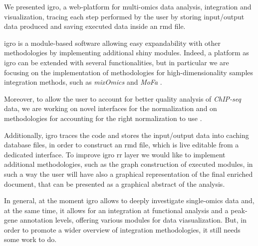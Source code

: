 We presented \gls{igro}, a web-platform for multi-omics data analysis, integration and visualization, tracing each step performed by the user by storing input/output data produced and saving executed data inside an \gls{rmd} file.

\gls{igro} is a module-based software allowing easy expandability with other methodologies by implementing additional shiny modules.
Indeed, a platform as \gls{igro} can be extended with several functionalities, but in particular we are focusing on the implementation of methodologies for high-dimensionality samples integration methods, such as \textit{mixOmics} \cite{Rohart2017} and \textit{MoFa} \cite{Argelaguet2018}.

Moreover, to allow the user to account for better quality analysis of \textit{ChIP-seq} data, we are working on novel interfaces for the normalization and on methodologies for accounting for the right normalization to use \cite{Angelini2015}.

Additionally, \gls{igro} traces the code and stores the input/output data into caching database files, in order to construct an \gls{rmd} file, which is live editable from a dedicated interface.
To improve \gls{igro} \gls{rr} layer we would like to implement additional methodologies, such as the graph construction of executed modules, in such a way the user will have also a graphical representation of the final enriched document, that can be presented as a graphical abstract of the analysis.

In general, at the moment \gls{igro} allows to deeply investigate single-omics data and, at the same time, it allows for an integration at functional analysis and a peak-gene annotation levels, offering various modules for data viasualization.
But, in order to promote a wider overview of integration methodologies, it still needs some work to do.
